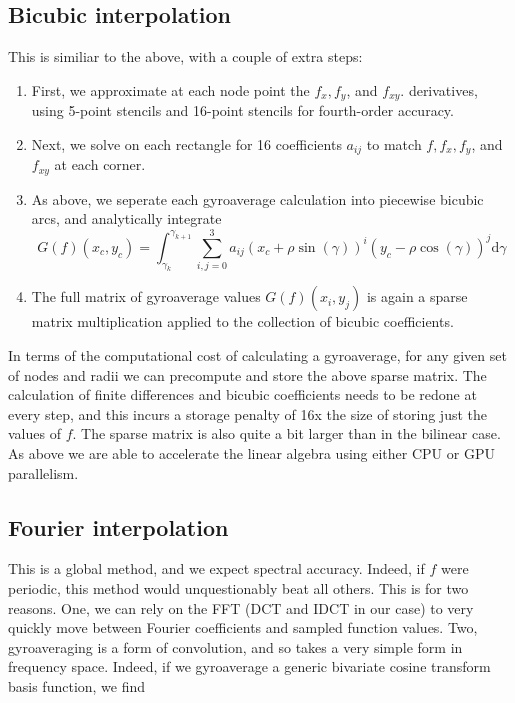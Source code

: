 \documentclass{article}
\theoremstyle{theorem}
\theoremstyle{definition}
\begin{document}
\subsection{Bicubic interpolation}
This is similiar to the above, with a couple of extra steps:
\begin{enumerate}
	\item First, we approximate at each node point the $f_x, f_y$, and $f_{xy}$. derivatives, using 5-point stencils and 16-point stencils for fourth-order accuracy. 
	\item Next,  we solve on each rectangle for 16 coefficients $a_{ij}$ to match $f, f_x, f_y$, and $f_{xy}$ at each corner. 
	\item As above, we seperate each gyroaverage calculation into piecewise bicubic arcs, and analytically integrate
		\[ G(f)(x_c,y_c) = \int_{\gamma_k}^{\gamma_{k+1}} \sum_{i,j=0}^{3} a_{ij} (x_c + \rho \sin(\gamma))^i (y_c - \rho \cos(\gamma))^j  \mathrm{d} \gamma\]
	\item The full matrix of gyroaverage values $G(f)(x_i,y_j)$ is again a sparse matrix multiplication applied to the collection of bicubic coefficients.  
\end{enumerate}
In terms of the computational cost of calculating a gyroaverage, for any given set of nodes and radii we can precompute and store the above sparse matrix.  The calculation of finite differences and bicubic coefficients needs to be redone at every step, and this incurs a storage penalty of 16x the size of storing just the values of $f$.  The sparse matrix is also quite a bit larger than in the bilinear case.  As above we are able to accelerate the linear algebra using either CPU or GPU parallelism.

\subsection{Fourier interpolation}
This is a global method, and we expect spectral accuracy.  Indeed, if $f$ were periodic, this method would unquestionably beat all others.  This is for two reasons.  One, we can rely on the FFT (DCT and IDCT in our case) to very quickly move between Fourier coefficients and sampled function values.  Two, gyroaveraging is a form of convolution, and so takes a very simple form in frequency space.  Indeed, if we gyroaverage a generic bivariate cosine transform basis function, we find
\end{document}
